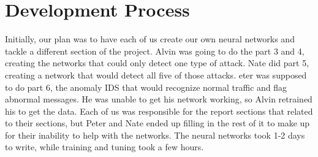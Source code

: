 \documentclass[letterpaper,12pt]{article}
\begin{document}
\section*{Development Process}
Initially, our plan was to have each of us create our own neural networks and
tackle a different section of the project. Alvin was going to do the part 3
and 4, creating the networks that could only detect one type of attack. Nate
did part 5, creating a network that would detect all five of those attacks.
eter was supposed to do part 6, the anomaly IDS that would recognize normal
traffic and flag abnormal messages. He was unable to get his network working,
so Alvin retrained his to get the data. Each of us was responsible for the
report sections that related to their sections, but Peter and Nate ended up
filling in the rest of it to make up for their inability to help with the
networks. The neural networks took 1-2 days to write, while training and
tuning took a few hours.
\end{document}
